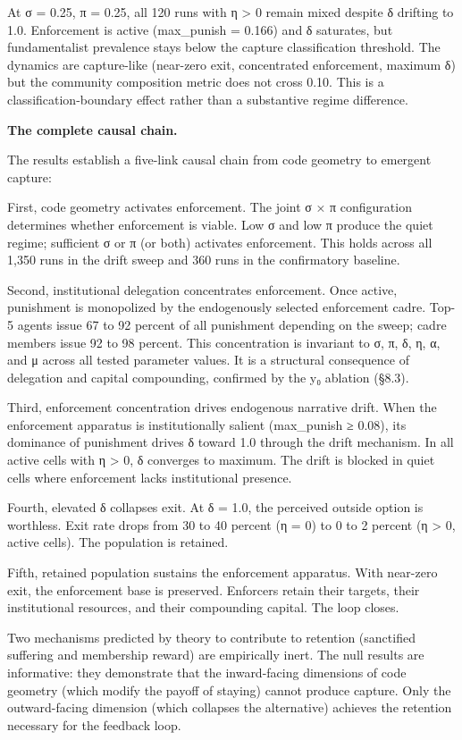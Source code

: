 \documentclass[12pt]{article}
\begin{document}
At σ = 0.25, π = 0.25, all 120 runs with η > 0 remain mixed despite δ drifting to 1.0. Enforcement is active (max\_punish = 0.166) and δ saturates, but fundamentalist prevalence stays below the capture classification threshold. The dynamics are capture-like (near-zero exit, concentrated enforcement, maximum δ) but the community composition metric does not cross 0.10. This is a classification-boundary effect rather than a substantive regime difference.

%

\textbf{The complete causal chain.}

The results establish a five-link causal chain from code geometry to emergent capture:

First, code geometry activates enforcement. The joint σ × π configuration determines whether enforcement is viable. Low σ and low π produce the quiet regime; sufficient σ or π (or both) activates enforcement. This holds across all 1,350 runs in the drift sweep and 360 runs in the confirmatory baseline.

Second, institutional delegation concentrates enforcement. Once active, punishment is monopolized by the endogenously selected enforcement cadre. Top-5 agents issue 67 to 92 percent of all punishment depending on the sweep; cadre members issue 92 to 98 percent. This concentration is invariant to σ, π, δ, η, α, and μ across all tested parameter values. It is a structural consequence of delegation and capital compounding, confirmed by the y₀ ablation (§8.3).

Third, enforcement concentration drives endogenous narrative drift. When the enforcement apparatus is institutionally salient (max\_punish ≥ 0.08), its dominance of punishment drives δ toward 1.0 through the drift mechanism. In all active cells with η > 0, δ converges to maximum. The drift is blocked in quiet cells where enforcement lacks institutional presence.

Fourth, elevated δ collapses exit. At δ = 1.0, the perceived outside option is worthless. Exit rate drops from 30 to 40 percent (η = 0) to 0 to 2 percent (η > 0, active cells). The population is retained.

Fifth, retained population sustains the enforcement apparatus. With near-zero exit, the enforcement base is preserved. Enforcers retain their targets, their institutional resources, and their compounding capital. The loop closes.

Two mechanisms predicted by theory to contribute to retention (sanctified suffering and membership reward) are empirically inert. The null results are informative: they demonstrate that the inward-facing dimensions of code geometry (which modify the payoff of staying) cannot produce capture. Only the outward-facing dimension (which collapses the alternative) achieves the retention necessary for the feedback loop.
\end{document}
